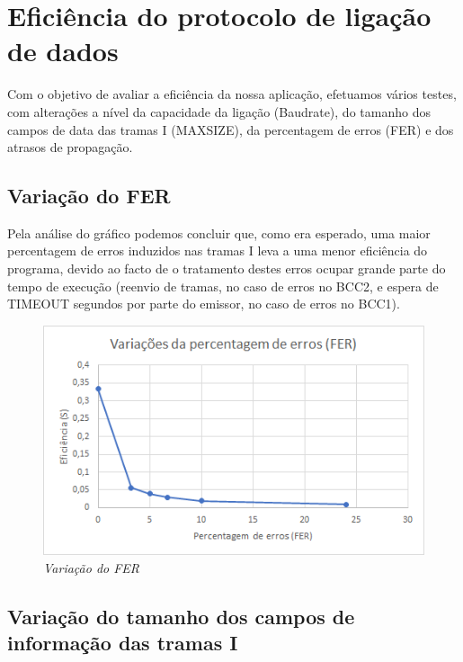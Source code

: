 \documentclass[article, a4paper, 11pt, oneside]{memoir}
\begin{document}
\chapter[Eficiência do protocolo de ligação de dados][Eficiência do protocolo de ligação de dados]{Eficiência do protocolo de ligação de dados} \label{\thechapter}

Com o objetivo de avaliar a eficiência da nossa aplicação, efetuamos vários testes, com alterações a nível da capacidade
da ligação (Baudrate), do tamanho dos campos de data das tramas I (MAX\textunderscore SIZE), da percentagem de erros (FER) e dos atrasos de propagação.

\section{Variação do FER}

Pela análise do gráfico podemos concluir que, como era esperado, uma maior percentagem de erros
induzidos nas tramas I leva a uma menor eficiência do programa, devido ao facto de o tratamento destes erros ocupar grande parte do tempo de execução
(reenvio de tramas, no caso de erros no BCC2, e espera de TIMEOUT segundos por parte do emissor, no caso de erros no BCC1).

\begin{figure}[h]
	\centering
\includegraphics[scale=0.4]{fer.png}
\caption{\emph{Variação do FER}}
\end{figure}

\section{Variação do tamanho dos campos de informação das tramas I}
\end{document}
